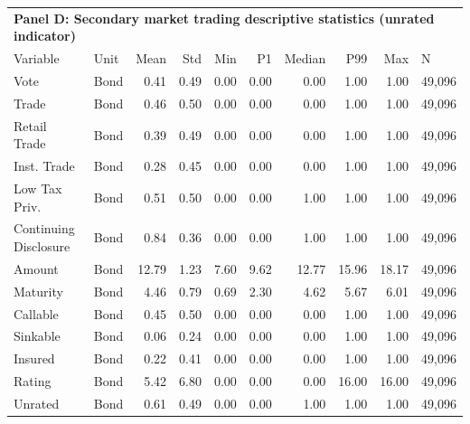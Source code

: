 \begin{table}[H]
\centering
\begin{tabular*}{\textwidth}{@{\extracolsep{\fill}}llrrrrrrrl}
\multicolumn{10}{l}{\textbf{Panel D: Secondary market trading descriptive statistics (unrated indicator)}}\\

\addlinespace
  \toprule
Variable & Unit & Mean & Std & Min & P1 & Median & P99 & Max & N \\ 
  \hline
Vote & Bond & 0.41 & 0.49 & 0.00 & 0.00 & 0.00 & 1.00 & 1.00 & 49,096 \\ 
  Trade & Bond & 0.46 & 0.50 & 0.00 & 0.00 & 0.00 & 1.00 & 1.00 & 49,096 \\ 
  Retail Trade & Bond & 0.39 & 0.49 & 0.00 & 0.00 & 0.00 & 1.00 & 1.00 & 49,096 \\ 
  Inst. Trade & Bond & 0.28 & 0.45 & 0.00 & 0.00 & 0.00 & 1.00 & 1.00 & 49,096 \\ 
  Low Tax Priv. & Bond & 0.51 & 0.50 & 0.00 & 0.00 & 1.00 & 1.00 & 1.00 & 49,096 \\ 
  Continuing Disclosure & Bond & 0.84 & 0.36 & 0.00 & 0.00 & 1.00 & 1.00 & 1.00 & 49,096 \\ 
  Amount & Bond & 12.79 & 1.23 & 7.60 & 9.62 & 12.77 & 15.96 & 18.17 & 49,096 \\ 
  Maturity & Bond & 4.46 & 0.79 & 0.69 & 2.30 & 4.62 & 5.67 & 6.01 & 49,096 \\ 
  Callable & Bond & 0.45 & 0.50 & 0.00 & 0.00 & 0.00 & 1.00 & 1.00 & 49,096 \\ 
  Sinkable & Bond & 0.06 & 0.24 & 0.00 & 0.00 & 0.00 & 1.00 & 1.00 & 49,096 \\ 
  Insured & Bond & 0.22 & 0.41 & 0.00 & 0.00 & 0.00 & 1.00 & 1.00 & 49,096 \\ 
  Rating & Bond & 5.42 & 6.80 & 0.00 & 0.00 & 0.00 & 16.00 & 16.00 & 49,096 \\ 
  Unrated & Bond & 0.61 & 0.49 & 0.00 & 0.00 & 1.00 & 1.00 & 1.00 & 49,096 \\ 
   \hline
\end{tabular*}
\end{table}
